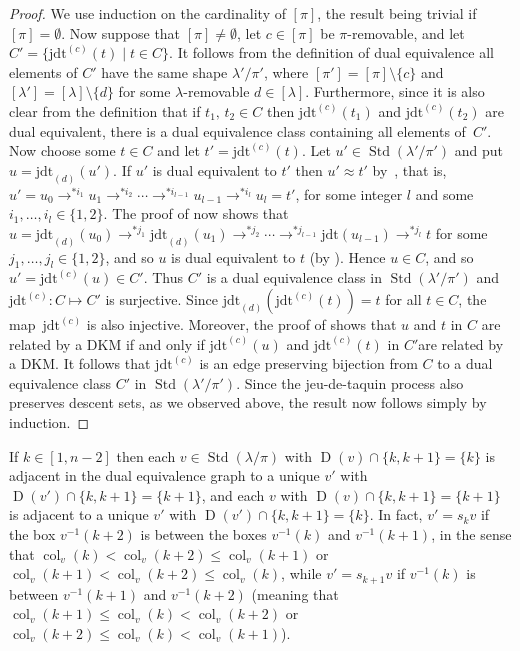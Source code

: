 \documentclass[ALCO,ThmDefs,Unicode,epreuves]{cedram}
\DeclareMathOperator{\col}{col}
\newcommand{\jdt}{\mathrm{jdt}}
\newcommand{\citex}[2]{\cite[#1]{#2}}
\DeclareMathOperator{\STD}{Std}
\DeclareMathOperator{\D}{D}
\begin{document}
\begin{proof}
We use induction on the cardinality of $[\pi]$, the result being trivial if $[\pi]=\emptyset$.
Now suppose that $[\pi]\ne\emptyset$, let $c\in[\pi]$ be $\pi$-removable,
and let $C'=\{\jdt^{(c)}(t)\mid t\in C\}$. It follows from the
definition of dual equivalence all elements of $C'$ have the same shape
$\lambda'/\pi'$, where $[\pi']=[\pi]\setminus\{c\}$ and
$[\lambda']=[\lambda]\setminus\{d\}$ for some $\lambda$-removable $d\in[\lambda]$.
Furthermore, since it is also clear from the definition that if $t_1,\,t_2\in C$
then $\jdt^{(c)}(t_1)$ and $\jdt^{(c)}(t_2)$ are dual equivalent, there is
a dual equivalence class containing all elements of~$C'$.
Now choose some $t\in C$ and let $t'=\jdt^{(c)}(t)$.
Let $u'\in\STD(\lambda'/\pi')$ and put $u=\jdt_{(d)}(u')$.
If $u'$ is dual equivalent to $t'$ then $u'\approx t'$
by~\citex{Theorem~3.8.8}{sag:sym}, that is,
$u'=u_0\to^{*i_{1}}u_1\to^{*i_{2}}\cdots \to^{*i_{l-1}} u_{l-1}\to^{*i_{l}}u_l=t'$, for
some integer $l$ and some $i_1,\ldots,i_l\in\{1,2\}$.
The proof of \citex{Theorem~3.8.8}{sag:sym} now shows that
$u=\jdt_{(d)}(u_0)\to^{*j_{1}}\jdt_{(d)}(u_1)\to^{*j_{2}}\cdots \to^{*j_{l-1}}\jdt(u_{l-1})\to^{*j_l} t$
for some $j_1,\ldots,j_l\in\{1,2\}$, and so
$u$ is dual equivalent to $t$ (by \citex{Theorem~3.8.8}{sag:sym}).
Hence $u\in C$, and so $u'=\jdt^{(c)}(u)\in C'$. Thus $C'$ is a dual equivalence
class in $\STD(\lambda'/\pi')$ and $\jdt^{(c)}\colon C\mapsto C'$ is surjective.
Since $\jdt_{(d)}(\jdt^{(c)}(t))=t$ for all $t\in C$,
the map~$\jdt^{(c)}$ is also injective. Moreover, the proof
of \text{\citex{Theorem~3.8.8}{sag:sym}} shows that $u$ and $t$ in $C$ are
related by a DKM if and only if $\jdt^{(c)}(u)$ and
$\jdt^{(c)}(t)$ in $C'$are related by a DKM.
It follows that $\jdt^{(c)}$ is an edge preserving bijection from $C$
to a dual equivalence class $C'$ in $\STD(\lambda'/\pi')$.
Since the jeu-de-taquin process also preserves descent sets, as we observed
above, the result now follows simply by induction.
\end{proof}

If $k\in[1,n-2]$ then each
$v\in\STD(\lambda/\pi)$ with $\D(v)\cap\{k,k+1\}=\{k\}$ is adjacent
in the dual equivalence graph to a unique $v'$ with
$\D(v')\cap\{k,k+1\}=\{k+1\}$, and each $v$ with
$\D(v)\cap\{k,k+1\}=\{k+1\}$
is adjacent to a unique $v'$ with $\D(v')\cap\{k,k+1\}=\{k\}$.
In fact, $v'=s_kv$ if
the box $v^{-1}(k+2)$ is between the boxes $v^{-1}(k)$ and $v^{-1}(k+1)$, in the sense that
$\col_v(k)<\col_v(k+2)\leq\col_v(k+1)$ or
$\col_v(k+1)<\col_v(k+2)\leq\col_v(k)$,
while $v'=s_{k+1}v$ if
$v^{-1}(k)$ is between $v^{-1}(k+1)$ and $v^{-1}(k+2)$ (meaning that
$\col_v(k+1)\leq\col_v(k)<\col_v(k+2)$ or
$\col_v(k+2)\leq\col_v(k)<\col_v(k+1)$).
\end{document}
